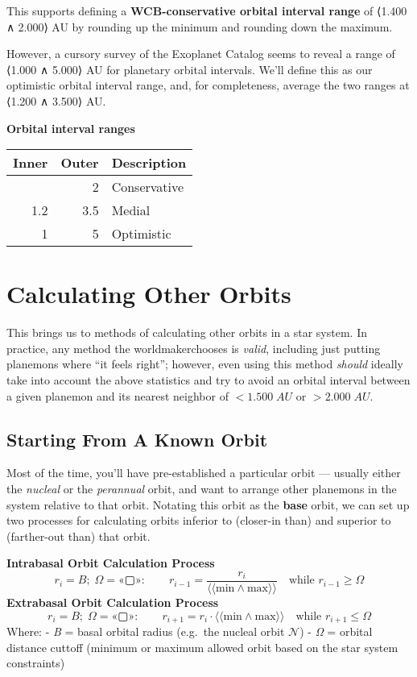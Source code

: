 \documentclass[
  letterpaper,
]{book}
\begin{document}
This supports defining a \textbf{WCB-conservative orbital interval
range} of ⟨1.400  ∧  2.000⟩  AU by rounding up the minimum and rounding
down the maximum.

However, a cursory survey of the Exoplanet Catalog seems to reveal a
range of ⟨1.000 ∧ 5.000⟩ AU for planetary orbital intervals. We'll
define this as our optimistic orbital interval range, and, for
completeness, average the two ranges at ⟨1.200 ∧ 3.500⟩ AU.

\textbf{Orbital interval ranges}

\begin{longtable}[]{@{}rrl@{}}
\toprule\noalign{}
Inner & Outer & Description \\
\midrule\noalign{}
\endhead
\bottomrule\noalign{}
\endlastfoot
1.4 & 2 & Conservative \\
1.2 & 3.5 & Medial \\
1 & 5 & Optimistic \\
\end{longtable}

\section{Calculating Other Orbits}\label{calculating-other-orbits}

This brings us to methods of calculating other orbits in a star system.
In practice, any method the worldmakerchooses is \emph{valid}, including
just putting planemons where ``it feels right''; however, even using
this method \emph{should} ideally take into account the above statistics
and try to avoid an orbital interval between a given planemon and its
nearest neighbor of \(< 1.500\;AU\) or \(> 2.000\;AU\).

\subsection{Starting From A Known
Orbit}\label{starting-from-a-known-orbit}

Most of the time, you'll have pre-established a particular orbit ---
usually either the \emph{nucleal} or the \emph{perannual} orbit, and
want to arrange other planemons in the system relative to that orbit.
Notating this orbit as the \textbf{base} orbit, we can set up two
processes for calculating orbits inferior to (closer-in than) and
superior to (farther-out than) that orbit.

\textbf{Intrabasal Orbit Calculation Process} \[
r_i = B;\; \Omega = \text{«▢»}: \qquad
r_{i-1} = \frac{r_i}{⟨⟨ \text{min} ∧ \text{max} ⟩⟩}
\quad \text{while } r_{i-1} \geq \Omega
\] \textbf{Extrabasal Orbit Calculation Process} \[
r_i = B;\; \Omega = \text{«▢»}: \qquad
r_{i+1} = r_i \cdot ⟨⟨ \text{min} ∧ \text{max} ⟩⟩
\quad \text{while } r_{i+1} \leq \Omega
\] Where: - \emph{B} = basal orbital radius (e.g.~the nucleal orbit
\(\mathcal{N}\)) - \emph{Ω} = orbital distance cuttoff (minimum or
maximum allowed orbit based on the star system constraints)
\end{document}
